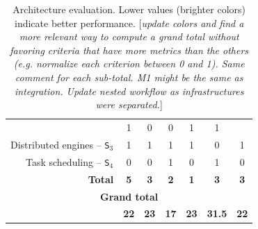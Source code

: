 \documentclass[preprint,3p,twocolumn]{elsarticle}
\newcommand{\todo}[1]{\color{blue}\xspace[\emph{#1}]\xspace\color{black}}
\begin{document}
\begin{table}
\begin{tabular}{rcccccc}
                                     & \cellcolor[HTML]{99DD99}1
                                     & \cellcolor[HTML]{99FF99}0
                                     & \cellcolor[HTML]{99FF99}0
                                     & \cellcolor[HTML]{99DD99}1
                                     & \cellcolor[HTML]{99DD99}1 \\
Distributed engines -- \texttt{S$_3$}& \cellcolor[HTML]{99AA99}1
                                     & \cellcolor[HTML]{99AA99}1
                                     & \cellcolor[HTML]{99AA99}1
                                     & \cellcolor[HTML]{99AA99}1
                                     & \cellcolor[HTML]{99FF99}0
                                     & \cellcolor[HTML]{99AA99}1 \\
Task scheduling -- \texttt{S$_4$}    & \cellcolor[HTML]{99FF99}0
                                     & \cellcolor[HTML]{99FF99}0
                                     & \cellcolor[HTML]{99AA99}1
                                     & \cellcolor[HTML]{99FF99}0
                                     & \cellcolor[HTML]{99FF99}1
                                     & \cellcolor[HTML]{99FF99}0 \\
\textbf{Total}                       & \cellcolor[HTML]{99AA99}\textbf{5}
                                     & \cellcolor[HTML]{99BB99}\textbf{3}
                                     & \cellcolor[HTML]{99DD99}\textbf{2}
                                     & \cellcolor[HTML]{99FF99}\textbf{1}
                                     & \cellcolor[HTML]{99DD99}\textbf{3}
                                     & \cellcolor[HTML]{99BB99}\textbf{3} \\
\multicolumn{7}{c}{\cellcolor[HTML]{EEEEEE}\textbf{Grand total}}\\
                                     & \cellcolor[HTML]{99CC99}\textbf{22}
                                     & \cellcolor[HTML]{99BB99}\textbf{23}
                                     & \cellcolor[HTML]{99FF99}\textbf{17}
                                     & \cellcolor[HTML]{99CC99}\textbf{23}
                                     & \cellcolor[HTML]{99DD99}\textbf{31.5}
                                     & \cellcolor[HTML]{99AA99}\textbf{22}
\end{tabular}
\caption{Architecture evaluation. Lower values (brighter colors) indicate better performance. \todo{update colors and find a more relevant way to compute a grand total without favoring criteria that have more metrics than the others (e.g. normalize each criterion between 0 and 1). Same comment for each sub-total. M1 might be the same as integration. Update nested workflow as infrastructures were separated.}}
\label{table:evaluation}
\end{table}
\end{document}
